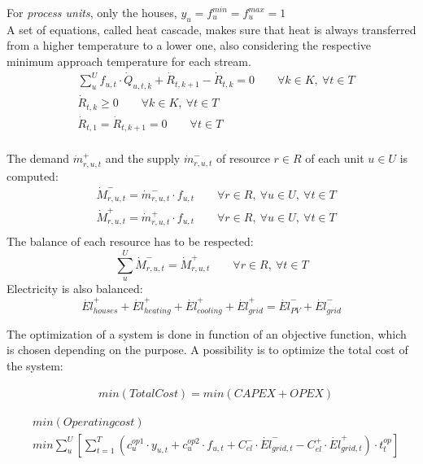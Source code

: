 \documentclass{article}
\begin{document}
For \textit{process units}, only the houses, $y_{u} = f_{u}^{min} = f_{u}^{max} = 1$\\

A set of equations, called heat cascade, makes sure that heat is always transferred from a higher temperature to a lower one, also considering the respective minimum approach temperature for each stream.
\begin{align}
& \sum_{u}^{U} f_{u,t}  \cdot \dot{Q}_{u,t,k} + \dot{R}_{t,k+1} - \dot{R}_{t,k} = 0 \qquad \forall k \in K, \ \forall t \in T \\
& \dot{R}_{t,k} \geq 0 \qquad \forall k \in K, \ \forall t \in T  \\
& \dot{R}_{t,1} = \dot{R}_{t,k+1} = 0 \qquad \forall t \in T  \\
\end{align}

The demand $\dot{m}_{r,u,t}^{+}$ and the supply $\dot{m}_{r,u,t}^{-}$ of resource $r \in R$ of each unit $u \in U$ is computed:
\begin{align}
& \dot{M}_{r,u,t}^{-} = \dot{m}_{r,u,t}^{-} \cdot f_{u,t} \qquad \forall r \in R, \ \forall u \in U, \ \forall t \in T \\
& \dot{M}_{r,u,t}^{+} = \dot{m}_{r,u,t}^{+} \cdot f_{u,t} \qquad \forall r \in R, \ \forall u \in U, \ \forall t \in T  \\
\end{align}
The balance of each resource has to be respected:
\begin{equation}
\sum_{u}^{U} \dot{M}_{r,u,t}^{-} = \dot{M}_{r,u,t}^{+} \qquad \forall r \in R, \ \forall t \in T
\end{equation}
Electricity is also balanced:
\begin{equation}
\dot{El}_{houses}^{+} + \dot{El}_{heating}^{+} + \dot{El}_{cooling}^{+} + \dot{El}_{grid}^{+} = \dot{El}_{PV}^{-} + \dot{El}_{grid}^{-}
\end{equation}

The optimization of a system is done in function of an objective function, which is chosen depending on the purpose. A possibility is to optimize the total cost of the system:

\begin{align}
& min \left( TotalCost \right)  = min \left(  CAPEX + OPEX \right) 
\end{align}

\begin{align}
& min \left( Operating cost \right) \\
& min \sum_{u}^{U} \left[ \sum_{t = 1}^{T} \left( c_{u}^{op1} \cdot y_{u,t} + c_{u}^{op2} \cdot f_{u,t} + C_{el}^{-} \cdot \dot{El}_{grid,t}^{-} - C_{el}^{+} \cdot \dot{El}_{grid,t}^{+} \right) \cdot t_{t}^{op} \right] \\
\end{align}
\end{document}
